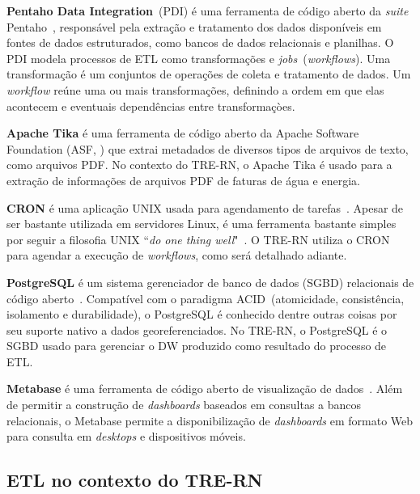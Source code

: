 \textbf{Pentaho Data Integration}~(PDI) é uma ferramenta de código aberto da \textit{suite} Pentaho~\cite{pentaho}, responsável pela extração e tratamento dos dados disponíveis em fontes de dados estruturados, como bancos de dados relacionais e planilhas. O PDI modela processos de ETL como transformações e \textit{jobs}~(\textit{workflows}). Uma transformação é um conjuntos de operações de coleta e tratamento de dados. Um \textit{workflow} reúne uma ou mais transformações, definindo a ordem em que elas acontecem e eventuais dependências entre transformaçòes.

\textbf{Apache Tika} é uma ferramenta de código aberto da Apache Software Foundation (ASF, \citet{apache}) que extrai metadados de diversos tipos de arquivos de texto, como arquivos PDF. No contexto do TRE-RN, o Apache Tika é usado para a extração de informações de arquivos PDF de faturas de água e energia.%

\textbf{CRON} é uma aplicação UNIX usada para agendamento de tarefas~\cite{cron}. Apesar de ser bastante utilizada em servidores Linux, é uma ferramenta bastante simples por seguir a filosofia UNIX ``\textit{do one thing well}"~\cite{unix}. O TRE-RN utiliza o CRON para agendar a execução de \textit{workflows}, como será detalhado adiante.

\textbf{PostgreSQL} é um sistema gerenciador de banco de dados (SGBD) relacionais de código aberto~\cite{postgres}. Compatível com o paradigma ACID~(atomicidade, consistência, isolamento e durabilidade), o PostgreSQL é conhecido dentre outras coisas por seu suporte nativo a dados georeferenciados. No TRE-RN, o PostgreSQL é o SGBD usado para gerenciar o DW produzido como resultado do processo de ETL. 

\textbf{Metabase} é uma ferramenta de código aberto de visualização de dados~\cite{metabase}. Além de permitir a construção de \textit{dashboards} baseados em consultas a bancos relacionais, o Metabase permite a disponibilização de \textit{dashboards} em formato Web para consulta em \textit{desktops} e dispositivos móveis.

\subsection{ETL no contexto do TRE-RN}

